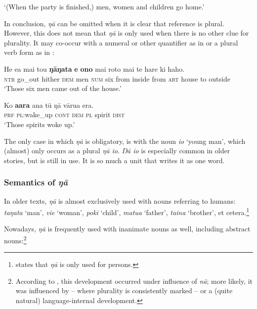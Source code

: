 \glt
‘(When the party is finished,) men, women and children go home.’ \textstyleExampleref{[Mtx-7-30.037]}
\z

In conclusion, \textit{ŋā} can be omitted when it is clear that reference is plural. However, this does not mean that \textit{ŋā} is only used when there is no other clue for plurality. It may co-occur with a numeral or other quantifier as in  or a plural verb form as in :

\ea\label{ex:5.80}
\gll He e{\ꞌ}a mai tou \textbf{ŋāŋata} \textbf{e} \textbf{ono} mai roto mai te hare ki haho. \\
\textsc{ntr} go\_out hither \textsc{dem} men \textsc{num} six from inside from \textsc{art} house to outside \\

\glt 
‘Those six men came out of the house.’ \textstyleExampleref{[Ley-4-01.023]}
\z

\ea\label{ex:5.81}
\gll Ko \textbf{{\ꞌ}a{\ꞌ}ara} {\ꞌ}ana tū ŋā vārua era. \\
\textsc{prf} \textsc{pl}:wake\_up \textsc{cont} \textsc{dem} \textsc{pl} spirit \textsc{dist} \\

\glt
‘Those spirits woke up.’ \textstyleExampleref{[R233.026]} 
\z

The only case in which \textit{ŋā} is obligatory, is with the noun \textit{io} ‘young man’, which (almost) only occurs as a plural \textit{ŋā io}. \textit{Ŋā io} is especially common in older stories, but is still in use. It is so much a unit that \citet{Englert1978,Englert1980} writes it as one word. 

\subsubsection[Semantics of ŋā]{Semantics of \textit{ŋā}}\label{sec:5.5.1.3}

In older texts, \textit{ŋā} is almost exclusively used with nouns referring to humans: \textit{taŋata} ‘man’, \textit{vi{\ꞌ}e} ‘woman’, \textit{poki} ‘child’, \textit{matu{\ꞌ}a} ‘father’, \textit{taina} ‘brother’, et cetera.\footnote{\label{fn:262}\citet[26]{Englert1978} states that \textit{ŋā} is only used for persons.} 

Nowadays, \textit{ŋā} is frequently used with inanimate nouns as well, including abstract nouns:\footnote{\label{fn:263}According to \citet[170]{Schuhmacher1993}, this development occurred under influence of  \textit{nā}; more likely, it was influenced by  – where plurality is consistently marked – or a (quite natural) language-internal development.}

